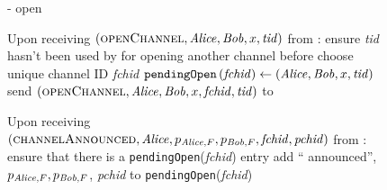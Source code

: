   \begin{figure}[H]
    \begin{systembox}{\fpaynet - open}
      \begin{algorithmic}[1]
        \State Upon receiving $\left(\textsc{openChannel}, \mathit{Alice}, \mathit{Bob}, x,
        \mathit{tid}\right)$ from \alice:
        \Indent
          \State ensure \textit{tid} hasn't been used by \alice{} for opening
          another channel before
          \State choose unique channel ID \textit{fchid}
          \State $\mathtt{pendingOpen}\left(\mathit{fchid}\right) \gets
          \left(\mathit{Alice}, \mathit{Bob}, x, \mathit{tid}\right)$
          \State send $\left(\textsc{openChannel}, \mathit{Alice}, \mathit{Bob}, x,
          \mathit{fchid}, \mathit{tid}\right)$ to \simulator
        \EndIndent
        \Statex

        \State Upon receiving $\left(\textsc{channelAnnounced}, \mathit{Alice},
        p_{\mathit{Alice}, F}, p_{\mathit{Bob}, F}, \mathit{fchid}, \mathit{pchid}\right)$ from
        \simulator:
        \Indent
          \State ensure that there is a \texttt{pendingOpen}(\textit{fchid})
          entry
          \State add ``\alice{} announced'', $p_{\mathit{Alice}, F}, p_{\mathit{Bob}, F}$,
          \textit{pchid} to \texttt{pendingOpen}(\textit{fchid})
        \EndIndent
        \Statex


\end{algorithmic}
\end{systembox}
\end{figure}
